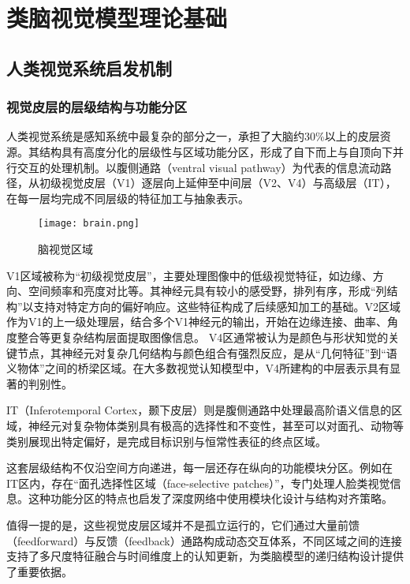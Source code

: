 \chapter{类脑视觉模型理论基础}

\section{人类视觉系统启发机制}

\subsection{视觉皮层的层级结构与功能分区}

人类视觉系统是感知系统中最复杂的部分之一，承担了大脑约30\%以上的皮层资源。其结构具有高度分化的层级性与区域功能分区，形成了自下而上与自顶向下并行交互的处理机制。以腹侧通路（ventral visual pathway）为代表的信息流动路径，从初级视觉皮层（V1）逐层向上延伸至中间层（V2、V4）与高级层（IT），在每一层均完成不同层级的特征加工与抽象表示\cite{ kanwisher2010functional}。

\begin{figure}[hbt]
	\centering
	\texttt{[image: brain.png]}
	\caption{脑视觉区域}
	\label{f.naoquyu}
\end{figure}

V1区域被称为“初级视觉皮层”，主要处理图像中的低级视觉特征，如边缘、方向、空间频率和亮度对比等。其神经元具有较小的感受野，排列有序，形成“列结构”以支持对特定方向的偏好响应。这些特征构成了后续感知加工的基础。V2区域作为V1的上一级处理层，结合多个V1神经元的输出，开始在边缘连接、曲率、角度整合等更复杂结构层面提取图像信息。
V4区通常被认为是颜色与形状知觉的关键节点，其神经元对复杂几何结构与颜色组合有强烈反应，是从“几何特征”到“语义物体”之间的桥梁区域。在大多数视觉认知模型中，V4所建构的中层表示具有显著的判别性。

IT（Inferotemporal Cortex，颞下皮层）则是腹侧通路中处理最高阶语义信息的区域，神经元对复杂物体类别具有极高的选择性和不变性，甚至可以对面孔、动物等类别展现出特定偏好，是完成目标识别与恒常性表征的终点区域。

这套层级结构不仅沿空间方向递进，每一层还存在纵向的功能模块分区。例如在IT区内，存在“面孔选择性区域（face-selective patches）”，专门处理人脸类视觉信息。这种功能分区的特点也启发了深度网络中使用模块化设计与结构对齐策略。

值得一提的是，这些视觉皮层区域并不是孤立运行的，它们通过大量前馈（feedforward）与反馈（feedback）通路构成动态交互体系，不同区域之间的连接支持了多尺度特征融合与时间维度上的认知更新，为类脑模型的递归结构设计提供了重要依据\cite{yamins2016using}。

